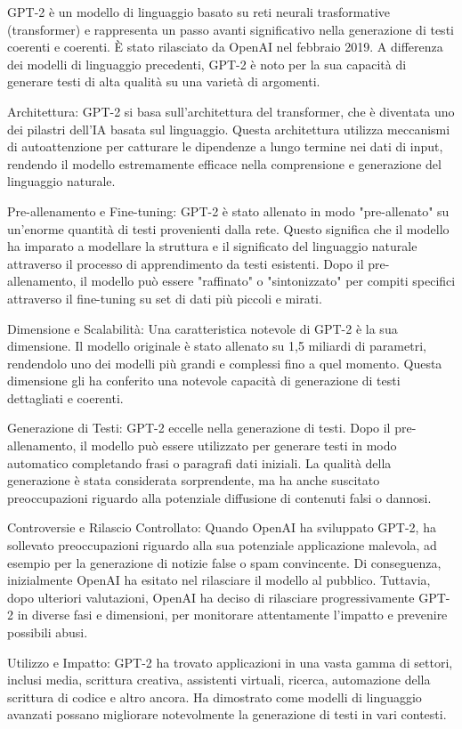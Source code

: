 GPT-2 è un modello di linguaggio basato su reti neurali trasformative (transformer) e rappresenta un passo avanti significativo nella generazione di testi coerenti e coerenti. È stato rilasciato da OpenAI nel febbraio 2019. A differenza dei modelli di linguaggio precedenti, GPT-2 è noto per la sua capacità di generare testi di alta qualità su una varietà di argomenti.

Architettura:
GPT-2 si basa sull'architettura del transformer, che è diventata uno dei pilastri dell'IA basata sul linguaggio. Questa architettura utilizza meccanismi di autoattenzione per catturare le dipendenze a lungo termine nei dati di input, rendendo il modello estremamente efficace nella comprensione e generazione del linguaggio naturale.

Pre-allenamento e Fine-tuning:
GPT-2 è stato allenato in modo "pre-allenato" su un'enorme quantità di testi provenienti dalla rete. Questo significa che il modello ha imparato a modellare la struttura e il significato del linguaggio naturale attraverso il processo di apprendimento da testi esistenti. Dopo il pre-allenamento, il modello può essere "raffinato" o "sintonizzato" per compiti specifici attraverso il fine-tuning su set di dati più piccoli e mirati.

Dimensione e Scalabilità:
Una caratteristica notevole di GPT-2 è la sua dimensione. Il modello originale è stato allenato su 1,5 miliardi di parametri, rendendolo uno dei modelli più grandi e complessi fino a quel momento. Questa dimensione gli ha conferito una notevole capacità di generazione di testi dettagliati e coerenti.

Generazione di Testi:
GPT-2 eccelle nella generazione di testi. Dopo il pre-allenamento, il modello può essere utilizzato per generare testi in modo automatico completando frasi o paragrafi dati iniziali. La qualità della generazione è stata considerata sorprendente, ma ha anche suscitato preoccupazioni riguardo alla potenziale diffusione di contenuti falsi o dannosi.

Controversie e Rilascio Controllato:
Quando OpenAI ha sviluppato GPT-2, ha sollevato preoccupazioni riguardo alla sua potenziale applicazione malevola, ad esempio per la generazione di notizie false o spam convincente. Di conseguenza, inizialmente OpenAI ha esitato nel rilasciare il modello al pubblico. Tuttavia, dopo ulteriori valutazioni, OpenAI ha deciso di rilasciare progressivamente GPT-2 in diverse fasi e dimensioni, per monitorare attentamente l'impatto e prevenire possibili abusi.

Utilizzo e Impatto:
GPT-2 ha trovato applicazioni in una vasta gamma di settori, inclusi media, scrittura creativa, assistenti virtuali, ricerca, automazione della scrittura di codice e altro ancora. Ha dimostrato come modelli di linguaggio avanzati possano migliorare notevolmente la generazione di testi in vari contesti.